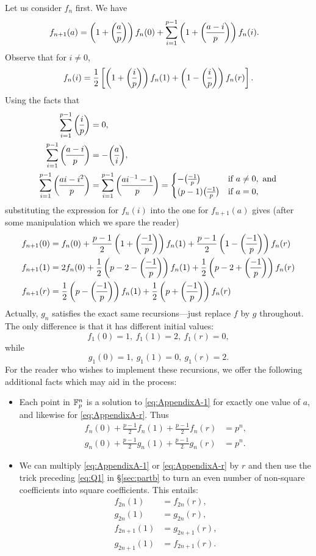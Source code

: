 Let us consider $f_n$ first. We have
\begin{align*}
	f_{n+1}(a) &= \left(1 + \legendre{a}{p}\right) f_n(0) + \sum_{i =1}^{p-1} \left(1 + \legendre{a-i}{p}\right)f_n(i) .
\end{align*}
Observe that for $i \neq 0$,
\[
	f_n(i) = \frac{1}{2}\left[\left(1 + \legendre{i}{p}\right)f_n(1) + \left(1 - \legendre{i}{p}\right) f_n(r)\right].
\]
Using the facts that
\begin{align*}
	\sum_{i=1}^{p-1} \legendre{i}{p} &= 0,\\
	\sum_{i=1}^{p-1} \legendre{a-i}{p} &= -\legendre{a}{i},\\
	\sum_{i=1}^{p-1} \legendre{ai -i^2}{p} &= \sum_{i=1}^{p-1} \legendre{ai^{-1} - 1}{p} = \begin{cases}
		-\legendre{-1}{p} & \text{if }a\neq 0, \text{ and}\\
		(p-1)\legendre{-1}{p} & \text{if }a=0,
	\end{cases}
\end{align*}
substituting the expression for $f_n(i)$ into the one for $f_{n+1}(a)$ gives (after some manipulation which we spare the reader)
\begin{align*}
	f_{n+1}(0) &= f_n(0) + \frac{p-1}{2}\left(1+\legendre{-1}{p}\right) f_n(1) + \frac{p-1}{2}\left(1-\legendre{-1}{p}\right) f_n(r)\\
	f_{n+1}(1) &= 2f_n(0) + \frac{1}{2}\left(p-2-\legendre{-1}{p}\right) f_n(1) + \frac{1}{2}\left(p-2+\legendre{-1}{p}\right) f_n(r)\\
	f_{n+1}(r) &= \frac{1}{2}\left(p-\legendre{-1}{p}\right) f_n(1) + \frac{1}{2}\left(p+\legendre{-1}{p}\right) f_n(r)
\end{align*}
Actually, $g_n$ satisfies the exact same recursions---just replace $f$ by $g$ throughout. The only difference is that it has different initial values:
\[
	f_1(0) = 1 ,\: f_1(1) = 2 ,\: f_1(r) = 0,
\]
while
\[
	g_1(0) = 1 ,\: g_1(1) = 0 ,\: g_1(r) = 2.
\]
For the reader who wishes to implement these recursions, we offer the following additional facts which may aid in the process:
\begin{itemize}
	\item Each point in $\mathbb{F}_p^n$ is a solution to \eqref{eq:AppendixA-1} for exactly one value of $a$, and likewise for \eqref{eq:AppendixA-r}. Thus
	\begin{align*}
		f_n(0) + \frac{p-1}{2}f_n(1) + \frac{p-1}{2}f_n(r) &= p^n,\\
		g_n(0) + \frac{p-1}{2}g_n(1) + \frac{p-1}{2}g_n(r) &= p^n.
	\end{align*}
	\item We can multiply \eqref{eq:AppendixA-1} or \eqref{eq:AppendixA-r} by $r$ and then use the trick preceding \eqref{eq:Q1} in \S\ref{sec:partb} to turn an even number of non-square coefficients into square coefficients. This entails:
	\begin{align*}
		f_{2n}(1) &= f_{2n}(r),\\
		g_{2n}(1) &= g_{2n}(r),\\
		f_{2n+1}(1) &= g_{2n+1}(r),\\
		g_{2n+1}(1) &= f_{2n+1}(r).
	\end{align*}
\end{itemize}